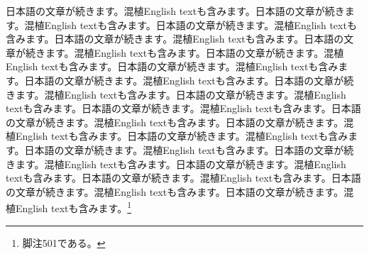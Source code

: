 \documentclass[pdflatex,book]{jlreq}
\begin{document}
日本語の文章が続きます。混植English textも含みます。日本語の文章が続きます。混植English textも含みます。日本語の文章が続きます。混植English textも含みます。日本語の文章が続きます。混植English textも含みます。日本語の文章が続きます。混植English textも含みます。日本語の文章が続きます。混植English textも含みます。日本語の文章が続きます。混植English textも含みます。日本語の文章が続きます。混植English textも含みます。日本語の文章が続きます。混植English textも含みます。日本語の文章が続きます。混植English textも含みます。日本語の文章が続きます。混植English textも含みます。日本語の文章が続きます。混植English textも含みます。日本語の文章が続きます。混植English textも含みます。日本語の文章が続きます。混植English textも含みます。日本語の文章が続きます。混植English textも含みます。日本語の文章が続きます。混植English textも含みます。日本語の文章が続きます。混植English textも含みます。日本語の文章が続きます。混植English textも含みます。日本語の文章が続きます。混植English textも含みます。日本語の文章が続きます。混植English textも含みます。\footnote{脚注501である。}
\end{document}
